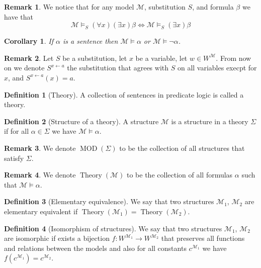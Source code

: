 \documentclass[11pt,a4paper]{article}
\theoremstyle{definition}
\newtheorem{definition}{Definition}[section]
\newtheorem{remark}{Remark}[section]
\theoremstyle{plain}
\newtheorem{corollary}[theorem]{Corollary}
\DeclareMathOperator{\MOD}{MOD}
\DeclareMathOperator{\Theory}{Theory}
\newcommand{\ot}{\leftarrow}
\newcommand{\M}{\mathcal{M}}
\begin{document}
  \begin{remark}
    We notice that for any model $\M$, substitution $S$, and formula $\beta$
    we have that
    \[
      \M \models_S (\forall x)(\exists x) \beta \iff
      \M \models_S (\exists x) \beta
    \]
  \end{remark}

  \begin{corollary}
    If $\alpha$ is a sentence then $\M \models \alpha$ or 
    $\M \models \neg \alpha$.
  \end{corollary}

  \begin{remark}
    Let $S$ be a substitution, let $x$ be a variable, let $w \in W^\M$.
    From now on we denote $S^{x \ot a}$ the substitution that agrees
    with $S$ on all variables execpt for $x$, and $S^{x \ot a}(x) = a$.
  \end{remark}


  \begin{definition}[Theory]
    A collection of sentences in predicate logic is called a theory.
  \end{definition}

  \begin{definition}[Structure of a theory]
    A structure $\M$ is a structure in a theory $\Sigma$ if for all
    $\alpha \in \Sigma$ we have $\M \models \alpha$.
  \end{definition}

  \begin{remark}
    We denote $\MOD(\Sigma)$ to be the collection of all structures that
    satisfy $\Sigma$.
  \end{remark}

  \begin{remark}
    We denote $\Theory(\M)$ to be the collection of all formulas $\alpha$
    such that $\M \models \alpha$.
  \end{remark}

  \begin{definition}[Elementary equivalence]
    We say that two structures $\M_1$, $\M_2$ are elementary equivalent
    if $\Theory(\M_1) = \Theory(\M_2)$.
  \end{definition}

  \begin{definition}[Isomorphism of structures]
    We say that two structures $\M_1$, $\M_2$ are isomorphic
    if exists a bijection $f \colon W^{\M_1} \to W^{\M_2}$ that preserves
    all functions and relations between the models and also
    for all constants $c^{\M_1}$ we have $f(c^{\M_1}) = c^{\M_2}$.
  \end{definition}
\end{document}
